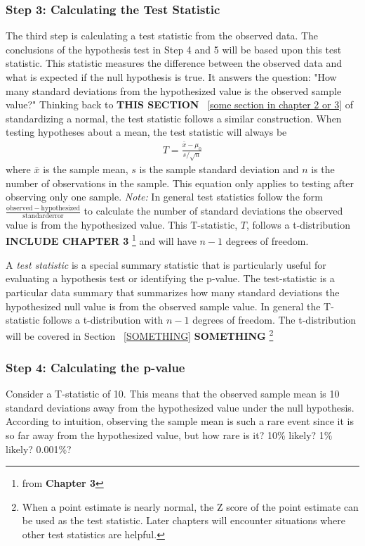 \subsubsection{Step 3: Calculating the Test Statistic}
The third step is calculating a test statistic from the observed data. The conclusions of the hypothesis test in Step 4 and 5 will be based upon this test statistic. This statistic measures the difference between the observed data and what is expected if the null hypothesis is true. It answers the question: "How many standard deviations from the hypothesized value is the observed sample value?" Thinking back to \textbf{THIS SECTION} ~\ref{some section in chapter 2 or 3} of standardizing a normal, the test statistic follows a similar construction. When testing hypotheses about a mean, the test statistic will always be 
\begin{eqnarray}T=\frac{\bar{x}-\mu_0}{s/\sqrt{n}}\end{eqnarray} 
where $\bar{x}$ is the sample mean, $s$ is the sample standard deviation and $n$ is the number of observations in the sample. This equation only applies to testing after observing only one sample. 
\emph{Note:} In general test statistics follow the form $\frac{\mathrm{observed-hypothesized}}{\mathrm{standard error}}$ to calculate the number of standard deviations the observed value is from the hypothesized value. This T-statistic, $T$, follows a t-distribution \textbf{INCLUDE CHAPTER 3} \footnote{ from \textbf{Chapter 3}} and will have $n-1$ degrees of freedom. 

\begin{termBox}{
A \emph{test statistic} is a special summary statistic that is particularly useful for evaluating a hypothesis test or identifying the p-value. The test-statistic is a particular data summary that summarizes how many standard deviations the hypothesized null value is from the observed sample value. In general the T-statistic follows a t-distribution with $n-1$ degrees of freedom. The t-distribution will be covered in Section ~\ref{SOMETHING} \textbf{SOMETHING} \footnote{When a point estimate is nearly normal, the Z score of the point estimate can be used as the test statistic. Later chapters will encounter situations where other test statistics are helpful.}}
\end{termBox}

\subsubsection{Step 4: Calculating the p-value}
Consider a T-statistic of 10. This means that the observed sample mean is 10 standard deviations away from the hypothesized value under the null hypothesis. According to intuition, observing the sample mean is such a rare event since it is so far away from the hypothesized value, but how rare is it? 10\% likely? 1\% likely? 0.001\%?


